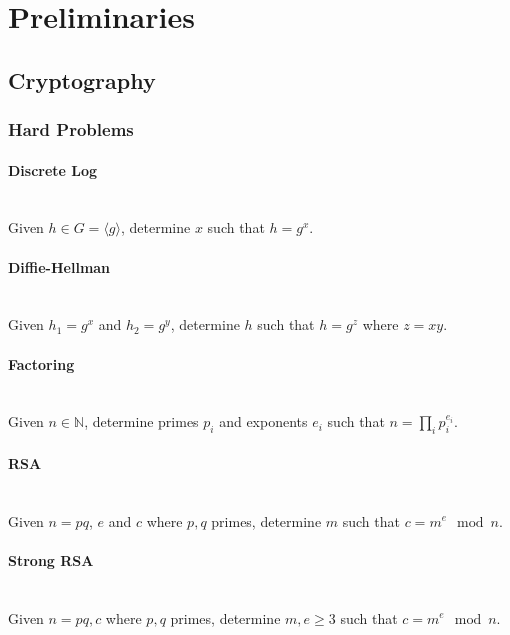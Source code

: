 \chapter{Preliminaries}

\section{Cryptography}

\subsection{Hard Problems}

\subsubsection{Discrete Log}~\\

Given $h \in G = \langle g \rangle$, determine $x$ such that $h = g^x$.

\subsubsection{Diffie-Hellman}~\\

Given $h_1 = g^x$ and $h_2 = g^y$, determine $h$ such that $h = g^z$ where $z = xy$.

\subsubsection{Factoring}~\\

Given $n \in \mathbb{N}$, determine primes $p_i$ and exponents $e_i$ such that $n = \prod_i p_i^{e_i}$.

\subsubsection{RSA}~\\

Given $n = pq$, $e$ and $c$ where $p, q$ primes, determine $m$ such that $c = m^e \mod n$.

\subsubsection{Strong RSA}~\\

Given $n = pq, c$ where $p, q$ primes, determine $m, e \geq 3$ such that $c = m^e \mod n$.


